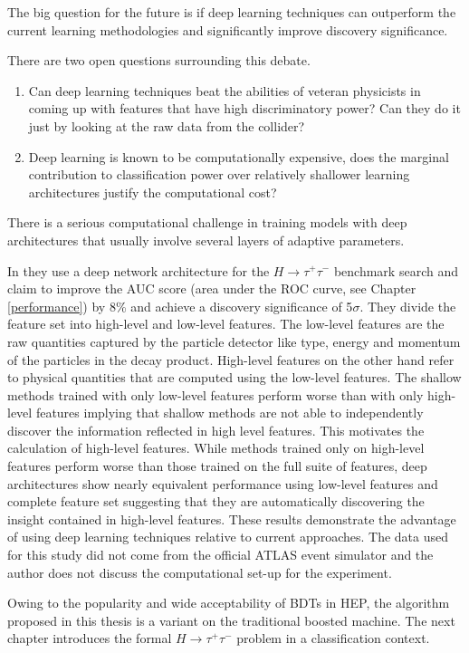 The big question for the future is if deep learning techniques can outperform the current learning methodologies and significantly improve discovery significance.

There are two open questions surrounding this debate. 

\begin{enumerate}
\item Can deep learning techniques beat the abilities of veteran physicists in coming up with features that have high discriminatory power? Can they do it just by looking at the raw data from the collider? 
\item Deep learning is known to be computationally expensive, does the marginal contribution to classification power over relatively shallower learning architectures justify the computational cost?
\end{enumerate}

There is a serious computational challenge in training models with deep architectures that usually involve several layers of adaptive parameters.  

In \cite{deep} they use a deep network architecture for the $H \rightarrow \tau^{+} \tau^{-}$ benchmark search and claim to improve the AUC score (area under the ROC curve, see Chapter \ref{performance}) by 8\% and achieve a discovery significance of 5$\sigma$. They divide the feature set into high-level and low-level features. The low-level features are the raw quantities captured by the particle detector like type, energy and momentum of the particles in the decay product. High-level features on the other hand refer to physical quantities that are computed using the low-level features. The shallow methods trained with only low-level features perform worse than with only high-level features implying that shallow methods are not able to independently discover the information reflected in high level features. This motivates the calculation of high-level features. While methods trained only on high-level features perform worse than those trained on the full suite of features, deep architectures show nearly equivalent performance using low-level features and complete feature set suggesting that they are automatically discovering the insight contained in high-level features. These results demonstrate the advantage of using deep learning techniques relative to current approaches. The data used for this study did not come from the official ATLAS event simulator and the author does not discuss the computational set-up for the experiment.  

Owing to the popularity and wide acceptability of BDTs in HEP, the algorithm proposed in this thesis is a variant on the traditional boosted machine. The next chapter introduces the formal $H \rightarrow \tau^{+} \tau^{-}$ problem in a classification context.  
 